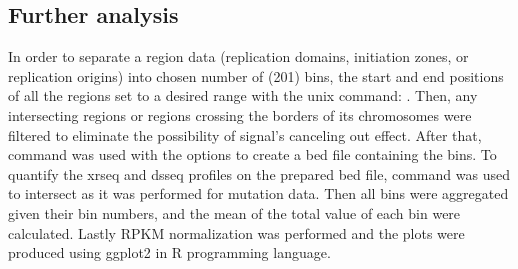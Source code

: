 \subsection{Further analysis}
In order to separate a region data (replication domains, initiation zones, or replication origins) into chosen number of (201) bins, the start and end positions of all the regions set to a desired range with the unix command:   . Then, any intersecting regions or regions crossing the borders of its chromosomes were filtered to eliminate the possibility of signal's canceling out effect. After that,  command was used with the  options to create a bed file containing the bins.
To quantify the \gls{xrseq} and \gls{dsseq} profiles on the prepared bed file,  command was used to intersect as it was performed for mutation data. Then all bins were aggregated given their bin numbers, and the mean of the total value of each bin were calculated. Lastly RPKM normalization was performed and the plots were produced using ggplot2 in R programming language.